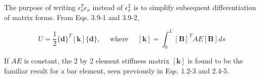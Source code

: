 \documentclass[10pt]{article}
\begin{document}
The purpose of writing $\epsilon_{x}^{T} \epsilon_{x}$ instead of $\epsilon_{x}^{2}$ is to simplify subsequent differentiation of matrix forms. From Eqs. 3.9-1 and 3.9-2,

\begin{equation*}
U=\frac{1}{2}\{\mathbf{d}\}^{T}[\mathbf{k}]\{\mathbf{d}\}, \quad \text { where } \quad [\mathbf{k}]=\int_{0}^{L}[\mathbf{B}]^{T} A E[\mathbf{B}] d s \tag{3.9-3}
\end{equation*}

If $A E$ is constant, the 2 by 2 element stiffness matrix $[\mathbf{k}]$ is found to be the familiar result for a bar element, seen previously in Eqs. 1.2-3 and 2.4-5.
\end{document}
